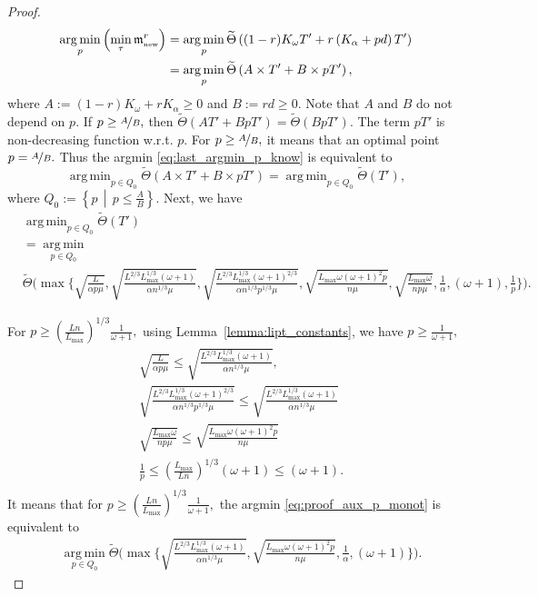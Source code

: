 \documentclass{article} %
\theoremstyle{plain}
\theoremstyle{definition}
\theoremstyle{remark}
\newcommand{\eqdef}{:=}
\DeclareMathOperator*{\argmin}{arg\,min}%
\begin{document}
\begin{proof}
\begin{align}
    \argmin_{p} \left(\min_{\tau} \mathfrak{m}^{r}_{{\scriptscriptstyle \textnormal{new}}}\right) &= \argmin_{p} \widetilde{\Theta} \left((1 - r)K_{\omega} T' + r \left(K_{\alpha} + p d\right) T'\right) \nonumber\\
    &= \argmin_{p} \widetilde{\Theta} \left(A \times T' + B \times p T'\right), \label{eq:last_argmin_p_know}
  \end{align}
  where $A \eqdef (1 - r)K_{\omega} + r K_{\alpha} \geq 0$ and $B \eqdef r d \geq 0.$ Note that $A$ and $B$ do not depend on $p.$ If $p \geq \nicefrac{A}{B},$ then $\widetilde{\Theta} \left(A T' + B p T'\right) = \widetilde{\Theta} \left(B p T'\right).$ The term $p T'$ is non-decreasing function w.r.t. $p.$ For $p \geq \nicefrac{A}{B},$ it means that an optimal point $p = \nicefrac{A}{B}.$ Thus the argmin \eqref{eq:last_argmin_p_know} is equivalent to $$\argmin_{p \in Q_0} \widetilde{\Theta} \left(A \times T' + B \times p T'\right) = \argmin_{p \in Q_0} \widetilde{\Theta} \left(T'\right),$$ where $Q_0 \eqdef \left\{p\,\middle|\, p \leq \frac{A}{B}\right\}.$
  Next, we have
  \begin{align}
    &\argmin_{p \in Q_0} \widetilde{\Theta} \left(T'\right) \nonumber\\
    &=\argmin\limits_{p \in Q_0} \nonumber\\
    &\widetilde{\Theta}\Bigg(\max\Bigg\{\sqrt{\frac{L}{\alpha p \mu}}, \sqrt{\frac{L^{2/3} L_{\max}^{1/3} (\omega + 1)}{\alpha n^{1/3} \mu}}, \sqrt{\frac{L^{2/3} L_{\max}^{1/3} (\omega + 1)^{2/3}}{\alpha n^{1/3} p^{1/3} \mu}}, \sqrt{\frac{L_{\max} \omega (\omega + 1)^2 p}{n \mu}}, \sqrt{\frac{L_{\max} \omega}{n p \mu}}, \frac{1}{\alpha}, (\omega + 1), \frac{1}{p}\Bigg\}\Bigg).\label{eq:proof_aux_p_monot}
  \end{align}

  For $p \geq \left(\frac{L n}{L_{\max}}\right)^{1/3} \frac{1}{\omega + 1},$ using Lemma~\ref{lemma:lipt_constants}, we have $p \geq \frac{1}{\omega + 1},$
  \begin{align*}
    &\sqrt{\frac{L}{\alpha p \mu}} \leq \sqrt{\frac{L^{2/3} L_{\max}^{1/3}  (\omega + 1)}{\alpha n^{1/3} \mu}},\\
    &\sqrt{\frac{L^{2/3} L_{\max}^{1/3} (\omega + 1)^{2/3}}{\alpha n^{1/3} p^{1/3} \mu}} \leq \sqrt{\frac{L^{2/3} L_{\max}^{1/3} (\omega + 1)}{\alpha n^{1/3} \mu}}\\
    &\sqrt{\frac{L_{\max} \omega}{n p \mu}} \leq \sqrt{\frac{L_{\max} \omega (\omega + 1)^2 p}{n \mu}}\\
    &\frac{1}{p} \leq \left(\frac{L_{\max}}{L n}\right)^{1/3} (\omega + 1) \leq (\omega + 1).\\
  \end{align*}
  It means that for $p \geq \left(\frac{L n}{L_{\max}}\right)^{1/3} \frac{1}{\omega + 1},$ the argmin \eqref{eq:proof_aux_p_monot} is equivalent to
  \begin{align*}
    &\argmin\limits_{p \in Q_0} \widetilde{\Theta}\Bigg(\max\Bigg\{\sqrt{\frac{L^{2/3} L_{\max}^{1/3} (\omega + 1)}{\alpha n^{1/3} \mu}}, \sqrt{\frac{L_{\max} \omega (\omega + 1)^2 p}{n \mu}}, \frac{1}{\alpha}, (\omega + 1)\Bigg\}\Bigg).
  \end{align*}


\end{proof}
\end{document}
